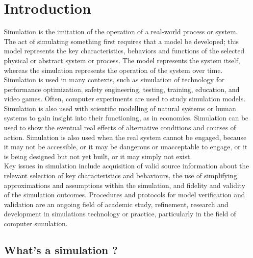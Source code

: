 \documentclass[12pt]{report}
\begin{document}
\section{Introduction}
Simulation is the imitation of the operation of a real-world process or system. The act of simulating something first requires that a model be developed; this model represents the key characteristics, behaviors and functions of the selected physical or abstract system or process. The model represents the system itself, whereas the simulation represents the operation of the system over time.
\\
Simulation is used in many contexts, such as simulation of technology for performance optimization, safety engineering, testing, training, education, and video games. Often, computer experiments are used to study simulation models. Simulation is also used with scientific modelling of natural systems or human systems to gain insight into their functioning, as in economics. Simulation can be used to show the eventual real effects of alternative conditions and courses of action. Simulation is also used when the real system cannot be engaged, because it may not be accessible, or it may be dangerous or unacceptable to engage, or it is being designed but not yet built, or it may simply not exist.
\\
Key issues in simulation include acquisition of valid source information about the relevant selection of key characteristics and behaviours, the use of simplifying approximations and assumptions within the simulation, and fidelity and validity of the simulation outcomes. Procedures and protocols for model verification and validation are an ongoing field of academic study, refinement, research and development in simulations technology or practice, particularly in the field of computer simulation.

\subsection{What's a simulation ?}
\end{document}
